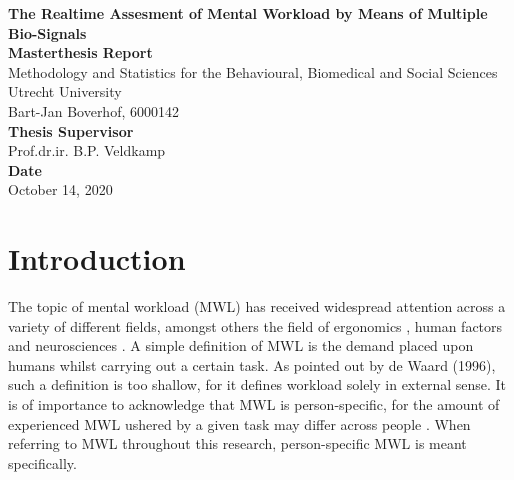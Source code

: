 \documentclass{article}
\begin{document}
\begin{titlepage}
\begin{center}
\LARGE{\textbf{The Realtime Assesment of Mental Workload by Means of Multiple Bio-Signals}}\\
\vspace*{2\baselineskip}
\Large{\textbf{Masterthesis Report}}\\
Methodology and Statistics for the Behavioural, Biomedical and Social Sciences\\
\vspace*{1\baselineskip}
Utrecht University\\
\vspace*{4\baselineskip}
{Bart-Jan Boverhof, 6000142}\\
\vspace*{1\baselineskip}
{\textbf{Thesis Supervisor}}\\
Prof.dr.ir. B.P. Veldkamp\\
\vspace*{1\baselineskip}
{\textbf{Date}}\\
October 14, 2020\\
\vspace*{1\baselineskip}
\end{center}
\end{titlepage}

\section{Introduction} \label{Introduction}
The topic of mental workload (MWL) has received widespread attention across a variety of different fields, amongst others the field of ergonomics \cite{young2015state}, human factors \cite{pretorius2007development} and neurosciences \cite{shuggi2017mental}.
A simple definition of MWL is the demand placed upon humans whilst carrying out a certain task. As pointed out by de Waard (1996), such a definition is too shallow, for it defines workload solely in external sense. It is of importance to acknowledge that MWL is person-specific, for the amount of experienced MWL ushered by a given task may differ across people \cite{de1996measurement}. When referring to MWL throughout this research, person-specific MWL is meant specifically.
\end{document}
